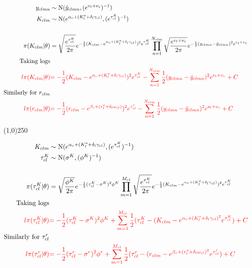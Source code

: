 \begin{align*}
y_{clmn} &\sim \operatorname{N}(\hat{y}_{clmn},(e^{ \upsilon_{l}+\nu_{c}  })^{-1} )\\ 
K_{clm} &\sim \operatorname{N}(e^{\alpha_{c}+(K_{l}^o+\delta_{l}\gamma_{cl})},(e^{ \tau_{cl}^K })^{-1})\\
\\
\pi(K_{clm}|\theta)&=\sqrt{\frac{e^{ \tau_{cl}^K }}{2\pi}} e^{-\frac{1}{2}(K_{clm}-e^{\alpha_{c}+(K_{l}^o+\delta_{l}\gamma_{cl})})^{2}e^{ \tau_{cl}^K } }
\prod_{n=1}^{N_{clm}}
\sqrt{\frac{
e^{ \upsilon_{l}+\nu_{c}}
}{2\pi}} e^{-\frac{1}{2}(
y_{clmn}-\hat{y}_{clmn}
)^{2} 
e^{ \upsilon_{l}+\nu_{c}}
}\\
\text{Taking logs}\\
\color{red}{l\pi(K_{clm}|\theta)}&
\color{red}{
=-\frac{1}{2}(K_{clm}-e^{\alpha_{c}+(K_{l}^o+\delta_{l}\gamma_{cl})})^{2}e^{\tau_{cl}^K}
-
\sum_{n=1}^{N_{clm}}\frac{1}{2}(y_{clmn}-\hat{y}_{clmn})^{2}e^{\nu_{l}+\upsilon_{c}}
+C
}
\\
\text{Similarly for $r_{clm}$}\\
\color{red}{l\pi(r_{clm}|\theta)}&
\color{red}{
=-\frac{1}{2}(r_{clm}-e^{\beta_{c}+(r_{l}^o+\delta_{l}\omega_{cl})})^{2}e^{\tau_{cl}^r}
-
\sum_{n=1}^{N_{clm}}\frac{1}{2}(y_{clmn}-\hat{y}_{clmn})^{2}e^{\nu_{l}+\upsilon_{c}}
+C
}
\end{align*}

\begin{center}
\line(1,0){250}
\end{center}

\begin{align*}
K_{clm} &\sim \operatorname{N}(e^{\alpha_{c}+(K_{l}^o+\delta_{l}\gamma_{cl})},(e^{ \tau_{cl}^K })^{-1})\\
\tau_{cl}^K &\sim \operatorname{N}(\sigma^{K}, (\phi^{K})^{-1} )\\
\\
\pi(\tau_{cl}^K |\theta)&=
\sqrt{\frac{\phi^{K}}{2\pi}} e^{-\frac{1}{2}(\tau_{cl}^K-\sigma^{K})^{2}\phi^{K} }
\prod_{m=1}^{M_{cl}}
\sqrt{\frac{
e^{ \tau_{cl}^K}
}{2\pi}} e^{-\frac{1}{2}(
K_{clm}-e^{\alpha_{c}+(K_{l}^o+\delta_{l}\gamma_{cl})}
)^{2} 
e^{ \tau_{cl}^K}
}\\
\text{Taking logs}\\
\color{red}{l\pi(\tau_{cl}^K|\theta)}&
\color{red}{
=-\frac{1}{2}(\tau_{cl}^K-\sigma^{K})^{2}\phi^{K}
+
\sum_{m=1}^{M_{cl}}\frac{1}{2}(\tau_{cl}^K-(K_{clm}-e^{\alpha_{c}+(K_{l}^o+\delta_{l}\gamma_{cl})^{2}}e^{\tau_{cl}^K})
+C}
\\
\text{Similarly for $\tau_{cl}^r$}\\
\color{red}{l\pi(\tau_{cl}^r|\theta)}&
\color{red}{
=-\frac{1}{2}(\tau_{cl}^r-\sigma^{r})^{2}\phi^{r}
+
\sum_{m=1}^{M_{cl}}\frac{1}{2}(\tau_{cl}^r-(r_{clm}-e^{\beta_{c}+(r_{l}^o+\delta_{l}\omega_{cl})^{2}}e^{\tau_{cl}^r})
+C}
\end{align*}